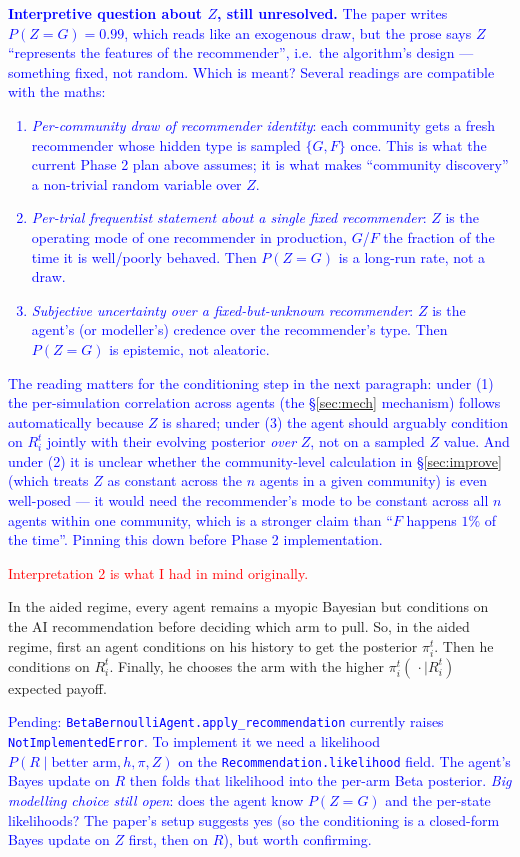 \documentclass[12pt]{article}
\newcommand{\ignacio}[1]{\textcolor{blue}{#1}}
\newcommand{\michael}[1]{\textcolor{red}{#1}}
\begin{document}
\ignacio{\textbf{Interpretive question about $Z$, still unresolved.} The paper writes $P(Z=G)=0.99$, which reads like an exogenous draw, but the prose says $Z$ ``represents the features of the recommender'', i.e.\ the algorithm's design --- something fixed, not random. Which is meant? Several readings are compatible with the maths:
\begin{enumerate}[leftmargin=*]
  \item \emph{Per-community draw of recommender identity}: each community gets a fresh recommender whose hidden type is sampled $\{G,F\}$ once. This is what the current Phase 2 plan above assumes; it is what makes ``community discovery'' a non-trivial random variable over $Z$.
  \item \emph{Per-trial frequentist statement about a single fixed recommender}: $Z$ is the operating mode of one recommender in production, $G$/$F$ the fraction of the time it is well/poorly behaved. Then $P(Z=G)$ is a long-run rate, not a draw.
  \item \emph{Subjective uncertainty over a fixed-but-unknown recommender}: $Z$ is the agent's (or modeller's) credence over the recommender's type. Then $P(Z=G)$ is epistemic, not aleatoric.
\end{enumerate}
The reading matters for the conditioning step in the next paragraph: under (1) the per-simulation correlation across agents (the \S\ref{sec:mech} mechanism) follows automatically because $Z$ is shared; under (3) the agent should arguably condition on $R_i^t$ jointly with their evolving posterior \emph{over} $Z$, not on a sampled $Z$ value. And under (2) it is unclear whether the community-level calculation in \S\ref{sec:improve} (which treats $Z$ as constant across the $n$ agents in a given community) is even well-posed --- it would need the recommender's mode to be constant across all $n$ agents within one community, which is a stronger claim than ``$F$ happens $1\%$ of the time''. Pinning this down before Phase 2 implementation.}

\michael{Interpretation 2 is what I had in mind originally.}


In the aided regime, every agent remains a myopic Bayesian but conditions on the AI recommendation before deciding which arm to pull.
So, in the aided regime, first an agent conditions on his history to get the posterior $\pi_i^t$.
Then he conditions on $R_i^t$.
Finally, he chooses the arm with the higher $\pi_i^t(\,\cdot \mid R_i^t)$ expected payoff.

\ignacio{Pending: \texttt{BetaBernoulliAgent.apply\_recommendation} currently raises \texttt{NotImplementedError}. To implement it we need a likelihood $P(R \mid \text{better arm}, h, \pi, Z)$ on the \texttt{Recommendation.likelihood} field. The agent's Bayes update on $R$ then folds that likelihood into the per-arm Beta posterior. \emph{Big modelling choice still open}: does the agent know $P(Z=G)$ and the per-state likelihoods? The paper's setup suggests yes (so the conditioning is a closed-form Bayes update on $Z$ first, then on $R$), but worth confirming.}
\end{document}
